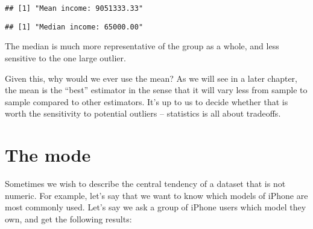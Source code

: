 \documentclass[]{book}
\newenvironment{Shaded}{\begin{snugshade}}{\end{snugshade}}
\newcommand{\KeywordTok}[1]{\textcolor[rgb]{0.13,0.29,0.53}{\textbf{#1}}}
\newcommand{\DecValTok}[1]{\textcolor[rgb]{0.00,0.00,0.81}{#1}}
\newcommand{\StringTok}[1]{\textcolor[rgb]{0.31,0.60,0.02}{#1}}
\newcommand{\CommentTok}[1]{\textcolor[rgb]{0.56,0.35,0.01}{\textit{#1}}}
\newcommand{\OperatorTok}[1]{\textcolor[rgb]{0.81,0.36,0.00}{\textbf{#1}}}
\newcommand{\NormalTok}[1]{#1}
\theoremstyle{definition}
\theoremstyle{definition}
\theoremstyle{definition}
\theoremstyle{remark}
\begin{document}
\begin{verbatim}
## [1] "Mean income: 9051333.33"
\end{verbatim}

\begin{Shaded}
\end{Shaded}

\begin{verbatim}
## [1] "Median income: 65000.00"
\end{verbatim}

The median is much more representative of the group as a whole, and less
sensitive to the one large outlier.

Given this, why would we ever use the mean? As we will see in a later
chapter, the mean is the ``best'' estimator in the sense that it will
vary less from sample to sample compared to other estimators. It's up to
us to decide whether that is worth the sensitivity to potential outliers
-- statistics is all about tradeoffs.

\section{The mode}\label{the-mode}

Sometimes we wish to describe the central tendency of a dataset that is
not numeric. For example, let's say that we want to know which models of
iPhone are most commonly used. Let's say we ask a group of iPhone users
which model they own, and get the following results:

\begin{Shaded}
\end{Shaded}
\end{document}
